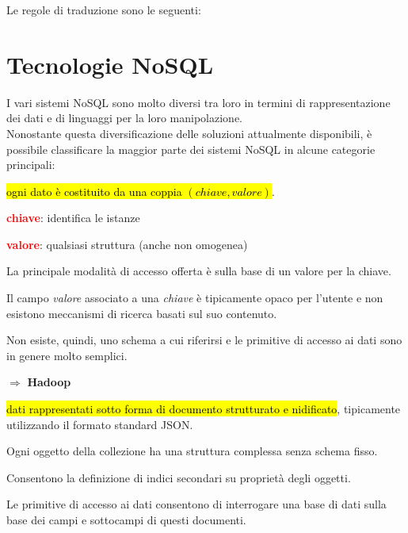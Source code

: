 \documentclass[12pt, a4paper, oneside]{book}
\begin{document}
    Le regole di traduzione sono le seguenti:



    \chapter{Tecnologie NoSQL}
    I vari sistemi NoSQL sono molto diversi tra loro in termini di rappresentazione dei dati e di linguaggi per la loro manipolazione.\\[0.2ex]
    Nonostante questa diversificazione delle soluzioni attualmente disponibili, è possibile classificare la maggior parte dei sistemi NoSQL in alcune categorie principali:

    \begin{description}[labelindent=0.5cm]
      \item[\textcolor{azzurrino}{sistemi chiave-valore}:] \hl{ogni dato è costituito da una coppia $(chiave, valore)$}.

      \hspace*{0.5cm}\textcolor{red}{\textbf{chiave}}: identifica le istanze

      \smallskip
      \hspace*{0.5cm}\textcolor{red}{\textbf{valore}}: qualsiasi struttura (anche non omogenea)

      \smallskip
      La principale modalità di accesso offerta è sulla base di un valore per la chiave.

      Il campo \textit{valore} associato a una \textit{chiave} è tipicamente opaco per l'utente e non esistono meccanismi di ricerca basati sul suo contenuto.

      Non esiste, quindi, uno schema a cui riferirsi e le primitive di accesso ai dati sono in genere molto semplici.

      \smallskip
      $\Rightarrow$ \textbf{Hadoop}

      \bigskip
      \item[\textcolor{azzurrino}{sistemi basati su documenti (document store)}:]
      \hl{dati rappresentati sotto forma di documento strutturato e nidificato},
      tipicamente utilizzando il formato standard JSON.

      Ogni oggetto della collezione ha una struttura complessa senza schema fisso.

      Consentono la definizione di indici secondari su proprietà degli oggetti.

      Le primitive di accesso ai dati consentono di interrogare una base di dati sulla base dei campi e sottocampi di questi documenti.


\end{description}
\end{document}
